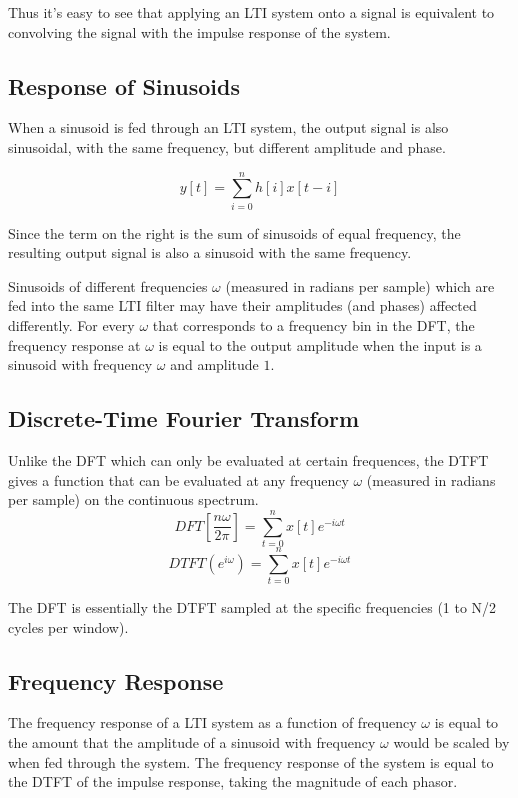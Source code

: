 \begin{center}\end{center}

Thus it's easy to see that applying an LTI system onto a signal is equivalent to 
convolving the signal with the impulse response of the system.

\subsection{Response of Sinusoids}
When a sinusoid is fed through an LTI system, the output signal is also sinusoidal,
with the same frequency, but different amplitude and phase.

$$y[t]=\sum_{i=0}^n h[i]x[t-i]$$

Since the term on the right is the sum of sinusoids of equal frequency,
the resulting output signal is also a sinusoid with the same frequency.

Sinusoids of different frequencies $\omega$ (measured in radians per sample) which are fed into the same LTI filter
may have their amplitudes (and phases) affected differently. 
For every $\omega$ that corresponds to a frequency bin in the DFT, 
the frequency response at $\omega$ is equal to the output amplitude when the input
is a sinusoid with frequency $\omega$ and amplitude $1$.

\pagebreak

\subsection{Discrete-Time Fourier Transform}
Unlike the DFT which can only be evaluated at certain frequences, 
the DTFT gives a function that can be evaluated at any frequency $\omega$ (measured in radians per sample) on the continuous spectrum.
$$DFT\left[\frac{n\omega}{2\pi}\right]=\sum_{t=0}^nx[t]e^{-i\omega t}$$
$$DTFT(e^{i\omega})=\sum_{t=0}^nx[t]e^{-i\omega t}$$

The DFT is essentially the DTFT sampled at the specific frequencies (1 to N/2 cycles per window).

\subsection{Frequency Response}
The frequency response of a LTI system as a function of frequency $\omega$ is equal
to the amount that the amplitude of a sinusoid with frequency $\omega$ would be scaled by when fed through the system.
The frequency response of the system is equal to the DTFT of the impulse response,
taking the magnitude of each phasor.

